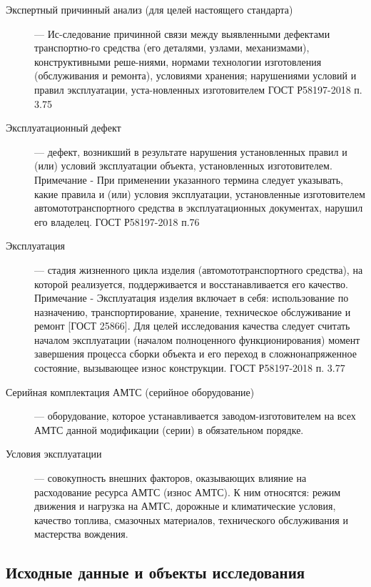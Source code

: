 \begin{description}
	
	\item[Экспертный причинный анализ (для целей настоящего стандарта)] --- Ис-следование причинной связи между выявленными дефектами транспортно-го средства (его деталями, узлами, механизмами), конструктивными реше-ниями, нормами технологии изготовления (обслуживания и ремонта), условиями хранения; нарушениями условий и правил эксплуатации, уста-новленных изготовителем ГОСТ Р58197-2018 п. 3.75
	
	\item[Эксплуатационный дефект] --- дефект, возникший в результате нарушения установленных правил и (или) условий эксплуатации объекта, установленных изготовителем. Примечание - При применении указанного термина следует указывать, какие правила и (или) условия эксплуатации, установленные изготовителем автомототранспортного средства в эксплуатационных документах, нарушил его владелец. ГОСТ Р58197-2018 п.76
	
	\item[Эксплуатация] --- стадия жизненного цикла изделия (автомототранспортного средства), на которой реализуется, поддерживается и восстанавливается его качество. Примечание - Эксплуатация изделия включает в себя: использование по назначению, транспортирование, хранение, техническое обслуживание и ремонт [ГОСТ 25866]. Для целей исследования качества следует считать началом эксплуатации (началом полноценного функционирования) момент завершения процесса сборки объекта и его переход в сложнонапряженное состояние, вызывающее износ конструкции. ГОСТ Р58197-2018 п. 3.77
	
	\item[Серийная комплектация  АМТС (серийное оборудование)] --- оборудование, которое устанавливается заводом-изготовителем на всех АМТС данной модификации (серии) в обязательном порядке. 
	
	\item[Условия эксплуатации] --- совокупность внешних факторов, оказывающих влияние на расходование ресурса АМТС (износ АМТС). К ним относятся: режим движения и нагрузка на АМТС, дорожные и климатические условия, качество топлива, смазочных материалов, технического обслуживания и мастерства вождения. 
	
\end{description}
\subsection{Исходные данные и объекты исследования}

